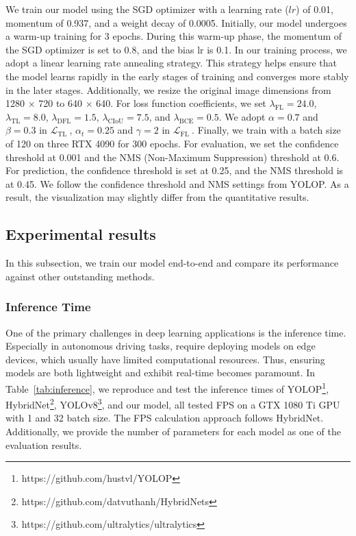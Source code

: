 \documentclass[lettersize,journal]{IEEEtran}
\begin{document}
We train our model using the SGD optimizer with a learning rate ($lr$) of 0.01, momentum of 0.937, and a weight decay of 0.0005. Initially, our model undergoes a warm-up training for 3 epochs. During this warm-up phase, the momentum of the SGD optimizer is set to 0.8, and the bias lr is 0.1. In our training process, we adopt a linear learning rate annealing strategy. This strategy helps ensure that the model learns rapidly in the early stages of training and converges more stably in the later stages. Additionally, we resize the original image dimensions from 1280 × 720 to 640 × 640. For loss function coefficients, we set $\lambda_{\text {FL}}=24.0$, $\lambda_{\text {TL}}=8.0$, $\lambda_{\text {DFL}}=1.5$, $\lambda_{\text {CIoU}}=7.5$, and $\lambda_{\text {BCE}}=0.5$. We adopt $\alpha=0.7$ and $\beta=0.3$ in $\mathcal{L}_{\text {TL }}$, $\alpha_t=0.25$ and $\gamma=2$ in $\mathcal{L}_{\text {FL }}$. Finally, we train with a batch size of 120 on three RTX 4090 for 300 epochs. For evaluation, we set the confidence threshold at 0.001 and the NMS (Non-Maximum Suppression) threshold at 0.6. For prediction, the confidence threshold is set at 0.25, and the NMS threshold is at 0.45. We follow the confidence threshold and NMS settings from YOLOP. As a result, the visualization may slightly differ from the quantitative results.




\subsection{Experimental results}
\label{subsec: Experimental results}
In this subsection, we train our model end-to-end and compare its performance against other outstanding methods.

\subsubsection{Inference Time}
\label{subsubsec: Inference Time}
One of the primary challenges in deep learning applications is the inference time. Especially in autonomous driving tasks, require deploying models on edge devices, which usually have limited computational resources. Thus, ensuring models are both lightweight and exhibit real-time becomes paramount. In Table~\ref{tab:inference}, we reproduce and test the inference times of YOLOP\footnote{https://github.com/hustvl/YOLOP}, HybridNet\footnote{https://github.com/datvuthanh/HybridNets}, YOLOv8\footnote{https://github.com/ultralytics/ultralytics}, and our model, all tested FPS on a GTX 1080 Ti GPU with 1 and 32 batch size. The FPS calculation approach follows HybridNet. Additionally, we provide the number of parameters for each model as one of the evaluation results.
\end{document}
